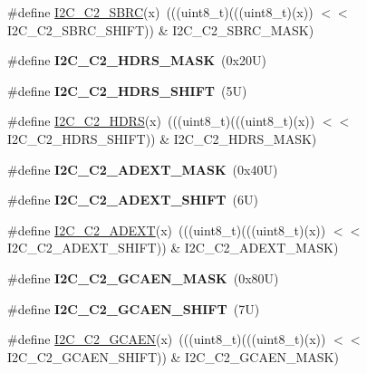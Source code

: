 \begin{DoxyCompactItemize}
\item 
\#define \mbox{\hyperlink{group___i2_c___register___masks_ga7ca1ec1871481fc75fb503d94403e577}{I2\+C\+\_\+\+C2\+\_\+\+S\+B\+RC}}(x)~(((uint8\+\_\+t)(((uint8\+\_\+t)(x)) $<$$<$ I2\+C\+\_\+\+C2\+\_\+\+S\+B\+R\+C\+\_\+\+S\+H\+I\+FT)) \& I2\+C\+\_\+\+C2\+\_\+\+S\+B\+R\+C\+\_\+\+M\+A\+SK)
\item 
\mbox{\label{group___i2_c___register___masks_gaa36c867ead9ecee381f4a6f1f75ccc70}} 
\#define {\bfseries I2\+C\+\_\+\+C2\+\_\+\+H\+D\+R\+S\+\_\+\+M\+A\+SK}~(0x20\+U)
\item 
\mbox{\label{group___i2_c___register___masks_ga0d2a8c7a7fb308cf052fc122c1af92c5}} 
\#define {\bfseries I2\+C\+\_\+\+C2\+\_\+\+H\+D\+R\+S\+\_\+\+S\+H\+I\+FT}~(5\+U)
\item 
\#define \mbox{\hyperlink{group___i2_c___register___masks_ga9304dab45ed8b48ddb4556d285a24111}{I2\+C\+\_\+\+C2\+\_\+\+H\+D\+RS}}(x)~(((uint8\+\_\+t)(((uint8\+\_\+t)(x)) $<$$<$ I2\+C\+\_\+\+C2\+\_\+\+H\+D\+R\+S\+\_\+\+S\+H\+I\+FT)) \& I2\+C\+\_\+\+C2\+\_\+\+H\+D\+R\+S\+\_\+\+M\+A\+SK)
\item 
\mbox{\label{group___i2_c___register___masks_ga331301810a6ac65f43e66b78bbde4c91}} 
\#define {\bfseries I2\+C\+\_\+\+C2\+\_\+\+A\+D\+E\+X\+T\+\_\+\+M\+A\+SK}~(0x40\+U)
\item 
\mbox{\label{group___i2_c___register___masks_ga266bbd66a022e8b78eb5501d9d927164}} 
\#define {\bfseries I2\+C\+\_\+\+C2\+\_\+\+A\+D\+E\+X\+T\+\_\+\+S\+H\+I\+FT}~(6\+U)
\item 
\#define \mbox{\hyperlink{group___i2_c___register___masks_ga3d010148d4874ad1f38fe8270015e7f8}{I2\+C\+\_\+\+C2\+\_\+\+A\+D\+E\+XT}}(x)~(((uint8\+\_\+t)(((uint8\+\_\+t)(x)) $<$$<$ I2\+C\+\_\+\+C2\+\_\+\+A\+D\+E\+X\+T\+\_\+\+S\+H\+I\+FT)) \& I2\+C\+\_\+\+C2\+\_\+\+A\+D\+E\+X\+T\+\_\+\+M\+A\+SK)
\item 
\mbox{\label{group___i2_c___register___masks_gabe69d0985ed23c71c071a6ebd93f65df}} 
\#define {\bfseries I2\+C\+\_\+\+C2\+\_\+\+G\+C\+A\+E\+N\+\_\+\+M\+A\+SK}~(0x80\+U)
\item 
\mbox{\label{group___i2_c___register___masks_ga2621c8acf26335441da9ced92ca4d29f}} 
\#define {\bfseries I2\+C\+\_\+\+C2\+\_\+\+G\+C\+A\+E\+N\+\_\+\+S\+H\+I\+FT}~(7\+U)
\item 
\#define \mbox{\hyperlink{group___i2_c___register___masks_gae5c83ddb6e61d570ef28b79fbdcff1bc}{I2\+C\+\_\+\+C2\+\_\+\+G\+C\+A\+EN}}(x)~(((uint8\+\_\+t)(((uint8\+\_\+t)(x)) $<$$<$ I2\+C\+\_\+\+C2\+\_\+\+G\+C\+A\+E\+N\+\_\+\+S\+H\+I\+FT)) \& I2\+C\+\_\+\+C2\+\_\+\+G\+C\+A\+E\+N\+\_\+\+M\+A\+SK)
\end{DoxyCompactItemize}

